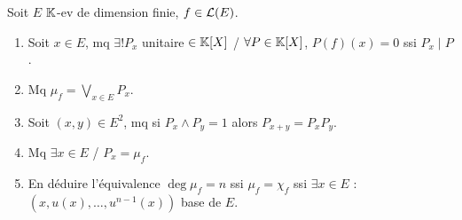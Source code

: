 
\begin{statementbox}
Soit $E$ $\mathbb K$-ev de dimension finie, $f\in\mathcal L(E)$.
\begin{enumerate}[label=\alph*)]
  \item Soit $x\in E$, mq $\exists!P_x$ unitaire $\in\mathbb K[X]$ /
  $\forall P\in\mathbb K[X]$, $P(f)(x)=0$ ssi $P_x\mid P$.
  \item Mq $\mu_f=\bigvee_{x\in E}P_x$.
  \item Soit $(x,y)\in E^2$, mq si $P_x\wedge P_y=1$ alors $P_{x+y}=P_xP_y$.
  \item Mq $\exists x\in E$ / $P_x=\mu_f$.
  \item En déduire l'équivalence
  $\deg\mu_f=n$ ssi $\mu_f=\chi_f$ ssi $\exists x\in E$ :
  $(x,u(x),\dots,u^{n-1}(x))$ base de $E$.
\end{enumerate}
\end{statementbox}

